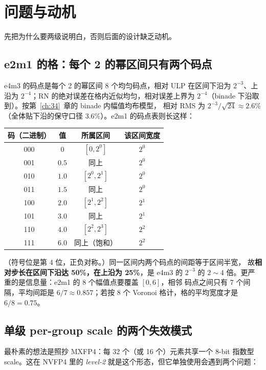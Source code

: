 \section{问题与动机}

先把为什么要两级说明白，否则后面的设计缺乏动机。

\subsection{e2m1 的格：每个 2 的幂区间只有两个码点}

e4m3 的码点是每个 2 的幂区间 8 个均匀码点，相对 ULP 在区间下沿为
$2^{-3}$、上沿为 $2^{-4}$；RN 的绝对误差在格内近似均匀，相对误差上界为
$2^{-4}$（binade 下沿取到）。按第~\ref{ch:34}~章的 binade 内幅值均布模型，
相对 RMS 为 $2^{-3}/\sqrt{24} \approx 2.6\%$（全体贴下沿的保守口径
$3.6\%$）。e2m1 的码点表则长这样：

\begin{center}
\footnotesize
\begin{tabular}{cccc}
\toprule
码（二进制） & 值 & 所属区间 & 该区间宽度 \\
\midrule
000 & $0$ & $[0,2^{0}]$ & $2^{0}$ \\
001 & $0.5$ & 同上 & $2^{0}$ \\
010 & $1.0$ & $[2^{0},2^{1}]$ & $2^{0}$ \\
011 & $1.5$ & 同上 & $2^{0}$ \\
100 & $2.0$ & $[2^{1},2^{2}]$ & $2^{1}$ \\
101 & $3.0$ & 同上 & $2^{1}$ \\
110 & $4.0$ & $[2^{2},2^{3}]$ & $2^{2}$ \\
111 & $6.0$ & 同上（饱和） & $2^{2}$ \\
\bottomrule
\end{tabular}
\end{center}

（符号位是第 4 位，正负对称。）同一区间内两个码点的间距等于区间半宽，
故\textbf{相对步长在区间下沿达 50\%，在上沿为 25\%}，是 e4m3 的 $2^{-3}$
的 $2\sim4$ 倍。更严重的是信息量：e2m1 的 8 个幅值点要覆盖 $[0,6]$，相邻
码点之间只有 7 个间隔，平均间距是 $6/7 \approx 0.857$；若按 8 个 Voronoi
格计，格的平均宽度才是 $6/8 = 0.75$。

\subsection{单级 per-group scale 的两个失效模式}

最朴素的想法是照抄 MXFP4：每 32 个（或 16 个）元素共享一个 8-bit 指数型
scale。这在 NVFP4 里的 \emph{level-2} 就是这个形态，但它单独使用会遇到两个问题：

